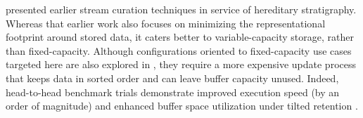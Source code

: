 \citet{moreno2024algorithms} presented earlier stream curation techniques in service of hereditary stratigraphy.
Whereas that earlier work also focuses on minimizing the representational footprint around stored data, it caters better to variable-capacity storage, rather than fixed-capacity.
Although configurations oriented to fixed-capacity use cases targeted here are also explored in \citet{moreno2024algorithms}, they require a more expensive update process that keeps data in sorted order and can leave buffer capacity unused.
Indeed, head-to-head benchmark trials demonstrate improved execution speed (by an order of magnitude) and enhanced buffer space utilization under tilted retention \citep{moreno2024guide,moreno2024trackable}.
